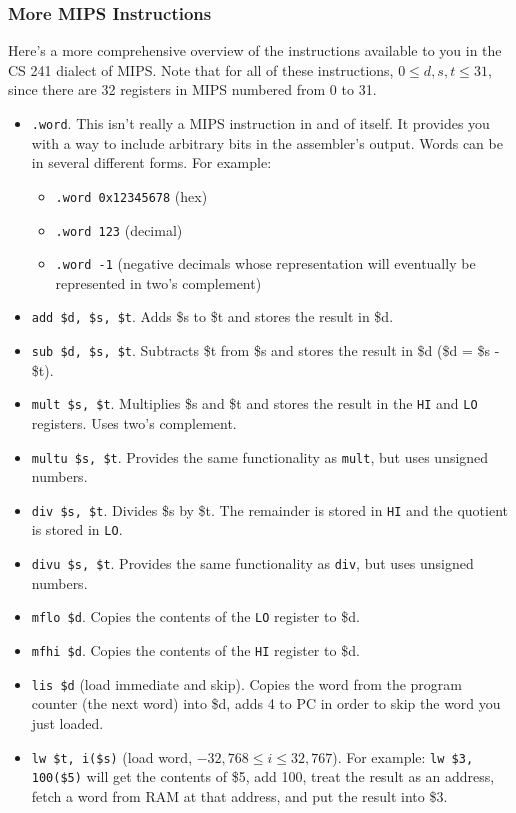 \documentclass[]{article}
\theoremstyle{definition}
\begin{document}
		\subsubsection{More MIPS Instructions}
			Here's a more comprehensive overview of the instructions available to you in the CS 241 dialect of MIPS. Note that for all of these instructions, $0 \le d, s, t \le 31$, since there are 32 registers in MIPS numbered from 0 to 31.
			\begin{itemize}
				\item \verb+.word+. This isn't really a MIPS instruction in and of itself. It provides you with a way to include arbitrary bits in the assembler's output. Words can be in several different forms. For example:
					\begin{itemize}
						\item \verb+.word 0x12345678+ (hex)
						\item \verb+.word 123+ (decimal)
						\item \verb+.word -1+ (negative decimals whose representation will eventually be represented in two's complement)
					\end{itemize}
				\item \verb+add $d, $s, $t+. Adds \$s to \$t and stores the result in \$d.
				\item \verb+sub $d, $s, $t+. Subtracts \$t from \$s and stores the result in \$d (\$d = \$s - \$t).
				\item \verb+mult $s, $t+. Multiplies \$s and \$t and stores the result in the \verb+HI+ and \verb+LO+ registers. Uses two's complement.
				\item \verb+multu $s, $t+. Provides the same functionality as \verb+mult+, but uses unsigned numbers.
				\item \verb+div $s, $t+. Divides \$s by \$t. The remainder is stored in \verb+HI+ and the quotient is stored in \verb+LO+.
				\item \verb+divu $s, $t+. Provides the same functionality as \verb+div+, but uses unsigned numbers.
				\item \verb+mflo $d+. Copies the contents of the \verb+LO+ register to \$d.
				\item \verb+mfhi $d+. Copies the contents of the \verb+HI+ register to \$d.
				\item \verb+lis $d+ (load immediate and skip). Copies the word from the program counter (the next word) into \$d, adds 4 to PC in order to skip the word you just loaded.
				\item \verb+lw $t, i($s)+ (load word, $-32,768 \le i \le 32,767$). For example: \verb+lw $3, 100($5)+ will get the contents of \$5, add 100, treat the result as an address, fetch a word from RAM at that address, and put the result into \$3.

\end{itemize}
\end{document}
